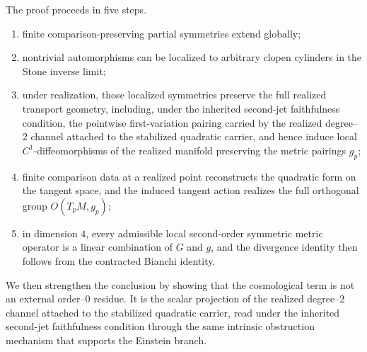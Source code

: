 The proof proceeds in five steps.
\begin{enumerate}[label=\textup{(\roman*)}]
	\item finite comparison-preserving partial symmetries extend globally;
	\item nontrivial automorphisms can be localized to arbitrary clopen
	      cylinders in the Stone inverse limit;
	\item under realization, those localized symmetries preserve the full
	      realized transport geometry, including, under the inherited
	      second-jet faithfulness condition, the pointwise first-variation
	      pairing carried by the realized degree--\(2\) channel attached
	      to the stabilized quadratic carrier, and hence induce local
	      \(C^1\)-diffeomorphisms of the realized manifold preserving the
	      metric pairings \(g_p\);
	\item finite comparison data at a realized point reconstructs the
	      quadratic form on the tangent space, and the induced tangent action
	      realizes the full orthogonal group \(O(T_pM,g_p)\);
	\item in dimension \(4\), every admissible local second-order symmetric
	      metric operator is a linear combination of \(G\) and \(g\), and the
	      divergence identity then follows from the contracted Bianchi identity.
\end{enumerate}
We then strengthen the conclusion by showing that the cosmological term
is not an external order--\(0\) residue.
It is the scalar projection of the realized degree--\(2\) channel
attached to the stabilized quadratic carrier, read under the
inherited second-jet faithfulness condition through the same
intrinsic obstruction mechanism that supports the Einstein branch.
